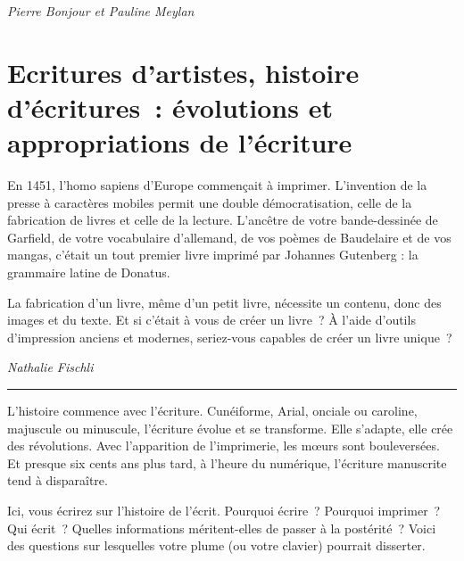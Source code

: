 \documentclass[
  10pt,
  french,
  a5paper,
  openany]{book}
\newenvironment{signature}{\begin{flushright}}{\end{flushright}}
\begin{document}
\begin{signature}
\emph{Pierre Bonjour et Pauline Meylan}

\end{signature}

\hypertarget{ecritures-dartistes-histoire-duxe9critures-uxe9volutions-et-appropriations-de-luxe9criture}{%
\chapter{\texorpdfstring{Ecritures d'artistes, histoire d'écritures~: \linebreak évolutions et appropriations de l'écriture}{Ecritures d'artistes, histoire d'écritures~: évolutions et appropriations de l'écriture}}\label{ecritures-dartistes-histoire-duxe9critures-uxe9volutions-et-appropriations-de-luxe9criture}}

En 1451, l'homo sapiens d'Europe commençait à imprimer. L'invention de la presse à caractères mobiles permit une double démocratisation, celle de la fabrication de livres et celle de la lecture. L'ancêtre de votre bande-dessinée de Garfield, de votre vocabulaire d'allemand, de vos poèmes de Baudelaire et de vos mangas, c'était un tout premier livre imprimé par Johannes Gutenberg : la grammaire latine de Donatus.

La fabrication d'un livre, même d'un petit livre, nécessite un contenu, donc des images et du texte. Et si c'était à vous de créer un livre~? À l'aide d'outils d'impression anciens et modernes, seriez-vous capables de créer un livre unique~?

\begin{signature}
\emph{Nathalie Fischli}

\end{signature}

\begin{center}\rule{0.5\linewidth}{0.5pt}\end{center}

L'histoire commence avec l'écriture. Cunéiforme, Arial, onciale ou caroline, majuscule ou minuscule, l'écriture évolue et se transforme. Elle s'adapte, elle crée des révolutions. Avec l'apparition de l'imprimerie, les mœurs sont bouleversées. Et presque six cents ans plus tard, à l'heure du numérique, l'écriture manuscrite tend à disparaître.

Ici, vous écrirez sur l'histoire de l'écrit. Pourquoi écrire~? Pourquoi imprimer~? Qui écrit~? Quelles informations méritent-elles de passer à la postérité~? Voici des questions sur lesquelles votre plume (ou votre clavier) pourrait disserter.
\end{document}
